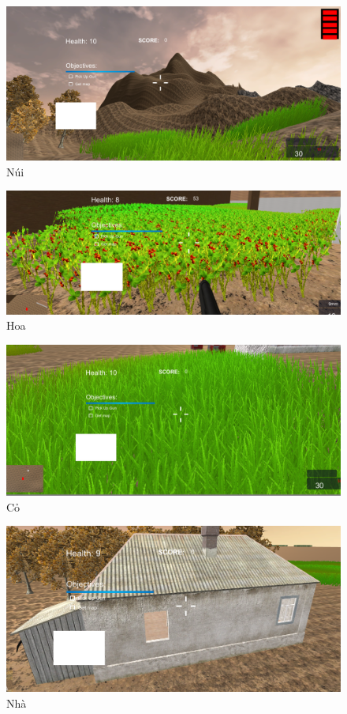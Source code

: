 \documentclass[14pt,a4paper]{extreport}
\begin{document}
	
\begin{figure}[h!]
	\includegraphics[scale=.5]{mountain.PNG}
	\caption{Núi}
\end{figure}

\begin{figure}
		\includegraphics[scale=.5]{flower.PNG}
	\caption{Hoa}
\end{figure} 

\begin{figure}
	\includegraphics[scale=.5]{grass.PNG}
	\caption{Cỏ}
\end{figure}
\begin{center}
	\begin{figure}
	\begin{center}
		\includegraphics[scale=.5]{house.PNG}
	\end{center}
	\caption{Nhà}
\end{figure}
\end{center}
\end{document}
